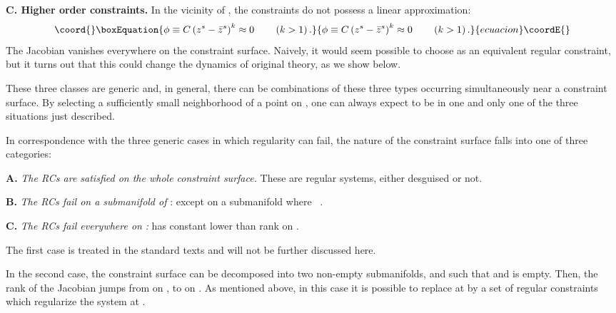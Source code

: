 \documentclass[a4paper,thmsa,11pt]{article}
\begin{document}
\textbf{C. Higher order constraints. }In the vicinity of \myHighlight{$\Sigma $}\coordHE{}, the
constraints do not possess a linear approximation:
\begin{equation}\coord{}\boxEquation{
\phi \equiv C\left( z^{s}-\bar{z}^{s}\right) ^{k}\approx 0\qquad \left(
k>1\right) .  \label{high-order}
}{
\phi \equiv C\left( z^{s}-\bar{z}^{s}\right) ^{k}\approx 0\qquad \left(
k>1\right) .  }{ecuacion}\coordE{}\end{equation}
The Jacobian vanishes everywhere on the constraint surface. Naively, it
would seem possible to choose \coordHE{} as an equivalent
regular constraint, but it turns out that this could change the dynamics of
original theory, as we show below.

These three classes are generic and, in general, there can be combinations
of these three types occurring simultaneously near a constraint surface. By
selecting a sufficiently small neighborhood of a point on \myHighlight{$\Sigma $}\coordHE{}, one can
always expect to be in one and only one of the three situations just
described.

In correspondence with the three generic cases in which regularity can fail,
the nature of the constraint surface \myHighlight{$\Sigma $}\coordHE{} falls into one of three
categories:\medskip

\textbf{A. }\emph{The RCs are satisfied on the whole constraint surface. }%
These are regular systems, either desguised or not.

\textbf{B. }\emph{The RCs fail on a submanifold of }\myHighlight{$\Sigma $}\coordHE{}: \coordHE{} except on a submanifold \coordHE{} where \coordHE{}\ .

\textbf{C. }\emph{The RCs fail everywhere on }\myHighlight{$\Sigma $}\coordHE{}\emph{:} \coordHE{} has
constant lower than \coordHE{} rank on \myHighlight{$\Sigma $}\coordHE{}.\medskip

The first case is treated in the standard texts and will not be further
discussed here.

In the second case, the constraint surface can be decomposed into two
non-empty submanifolds, \coordHE{} and \coordHE{} such that \coordHE{} and \coordHE{} is empty.
Then, the rank of the Jacobian jumps from \coordHE{} on \coordHE{}, to \coordHE{} on \coordHE{}. As
mentioned above, in this case it is possible to replace \myHighlight{$\phi $}\coordHE{} at \coordHE{} by a set of regular constraints \coordHE{} which regularize the system at \coordHE{}.
\end{document}
